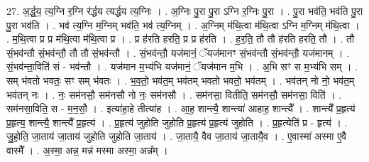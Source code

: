 \documentclass[17pt]{extarticle}
\begin{document}
27. अ॒र्द्ध॒य॒ त्य॒ग्नि र॒ग्नि र॑र्द्धय त्यर्द्धय त्य॒ग्निः । . अ॒ग्निः पु॒रा पु॒रा ऽग्नि र॒ग्निः पु॒रा । . पु॒रा भव॑ति॒ भव॑ति पु॒रा पु॒रा भव॑ति । . भव॑ त्य॒ग्नि म॒ग्निम् भव॑ति॒ भव॑ त्य॒ग्निम् । . अ॒ग्निम् म॑थि॒त्वा म॑थि॒त्वा ऽग्नि म॒ग्निम् म॑थि॒त्वा । . म॒थि॒त्वा प्र प्र म॑थि॒त्वा म॑थि॒त्वा प्र । . प्र ह॑रति हरति॒ प्र प्र ह॑रति । . ह॒र॒ति॒ तौ तौ ह॑रति हरति॒ तौ । . तौ सं॒भव॑न्तौ सं॒भव॑न्तौ॒ तौ तौ सं॒भव॑न्तौ । . सं॒भव॑न्तौ॒ यज॑मानं॒ ॅयज॑मानꣳ सं॒भव॑न्तौ सं॒भव॑न्तौ॒ यज॑मानम् । . सं॒भव॑न्ता॒विति॑ सं - भव॑न्तौ । . यज॑मान म॒भ्य॑भि यज॑मानं॒ ॅयज॑मान म॒भि । . अ॒भि सꣳ स म॒भ्य॑भि सम् । . सम् भ॑वतो भवतः॒ सꣳ सम् भ॑वतः । . भ॒व॒तो॒ भव॑त॒म् भव॑तम् भवतो भवतो॒ भव॑तम् । . भव॑तन् नो नो॒ भव॑त॒म् भव॑तन् नः । . नः॒ सम॑नसौ॒ सम॑नसौ नो नः॒ सम॑नसौ । . सम॑नसा॒ वितीति॒ सम॑नसौ॒ सम॑नसा॒ विति॑ । . सम॑नसा॒विति॒ स - म॒न॒सौ॒ । . इत्या॑हा॒हे तीत्या॑ह । . आ॒ह॒ शान्त्यै॒ शान्त्या॑ आहाह॒ शान्त्यै᳚ । . शान्त्यै᳚ प्र॒हृत्य॑ प्र॒हृत्य॒ शान्त्यै॒ शान्त्यै᳚ प्र॒हृत्य॑ । . प्र॒हृत्य॑ जुहोति जुहोति प्र॒हृत्य॑ प्र॒हृत्य॑ जुहोति । . प्र॒हृत्येति॑ प्र - हृत्य॑ । . जु॒हो॒ति॒ जा॒ताय॑ जा॒ताय॑ जुहोति जुहोति जा॒ताय॑ । . जा॒तायै॒ वैव जा॒ताय॑ जा॒तायै॒व । . ए॒वास्मा॑ अस्मा ए॒वै वास्मै᳚ । . अ॒स्मा॒ अन्न॒ मन्न॑ मस्मा अस्मा॒ अन्न᳚म् । \newline
\end{document}
